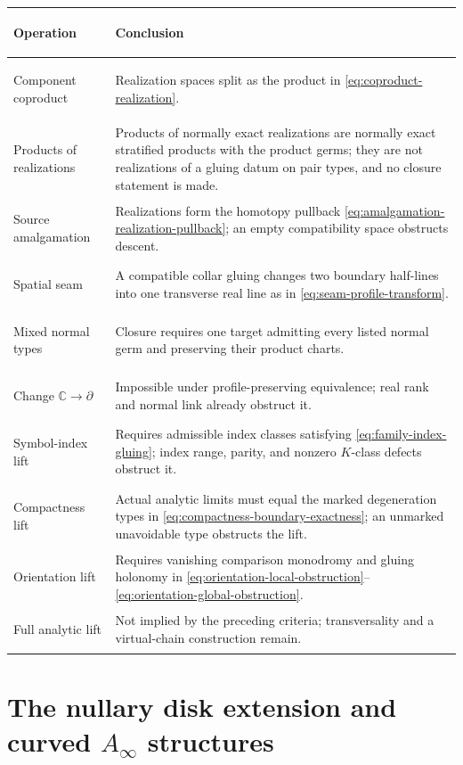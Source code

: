 \documentclass[11pt,letterpaper,twoside]{article}
\theoremstyle{plain}
\theoremstyle{definition}
\theoremstyle{remark}
\newcommand{\Ainf}{A_\infty}
\begin{document}
\begin{center}
\small
\renewcommand{\arraystretch}{0.94}
\begin{tabularx}{\textwidth}{@{}>{\bfseries\raggedright\arraybackslash}p{}X@{}}
\toprule
Operation & Conclusion \\
\midrule
Component coproduct & Realization spaces split as the product in \eqref{eq:coproduct-realization}. \\
Products of realizations & Products of normally exact realizations are normally exact stratified products with the product germs; they are not realizations of a gluing datum on pair types, and no closure statement is made. \\
Source amalgamation & Realizations form the homotopy pullback \eqref{eq:amalgamation-realization-pullback}; an empty compatibility space obstructs descent. \\
Spatial seam & A compatible collar gluing changes two boundary half-lines into one transverse real line as in \eqref{eq:seam-profile-transform}. \\
Mixed normal types & Closure requires one target admitting every listed normal germ and preserving their product charts. \\
Change \(\mathbb C\to\partial\) & Impossible under profile-preserving equivalence; real rank and normal link already obstruct it. \\
Symbol-index lift & Requires admissible index classes satisfying \eqref{eq:family-index-gluing}; index range, parity, and nonzero $K$-class defects obstruct it. \\
Compactness lift & Actual analytic limits must equal the marked degeneration types in \eqref{eq:compactness-boundary-exactness}; an unmarked unavoidable type obstructs the lift. \\
Orientation lift & Requires vanishing comparison monodromy and gluing holonomy in \eqref{eq:orientation-local-obstruction}--\eqref{eq:orientation-global-obstruction}. \\
Full analytic lift & Not implied by the preceding criteria; transversality and a virtual-chain construction remain. \\
\bottomrule
\end{tabularx}
\end{center}

\section{The nullary disk extension and curved \texorpdfstring{\(\Ainf\)}{A-infinity} structures}\label{sec:curved}
\end{document}
